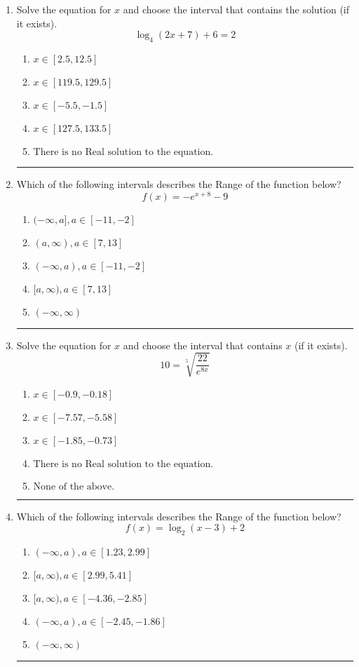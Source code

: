 \documentclass[14pt]{extbook}
\newcommand{\litem}[1]{\item#1\hspace*{-1cm}\rule{\textwidth}{0.4pt}}
\begin{document}
\begin{enumerate}
{\begin{enumerate}[label=\Alph*.]
\end{enumerate} }
\litem{
Solve the equation for $x$ and choose the interval that contains the solution (if it exists).\[ \log_{4}{(2x+7)}+6 = 2 \]\begin{enumerate}[label=\Alph*.]
\item \( x \in [2.5, 12.5] \)
\item \( x \in [119.5, 129.5] \)
\item \( x \in [-5.5, -1.5] \)
\item \( x \in [127.5, 133.5] \)
\item \( \text{There is no Real solution to the equation.} \)

\end{enumerate} }
\litem{
Which of the following intervals describes the Range of the function below?\[ f(x) = -e^{x+8}-9 \]\begin{enumerate}[label=\Alph*.]
\item \( (-\infty, a], a \in [-11, -2] \)
\item \( (a, \infty), a \in [7, 13] \)
\item \( (-\infty, a), a \in [-11, -2] \)
\item \( [a, \infty), a \in [7, 13] \)
\item \( (-\infty, \infty) \)

\end{enumerate} }
\litem{
 Solve the equation for $x$ and choose the interval that contains $x$ (if it exists).\[  10 = \sqrt[5]{\frac{22}{e^{8x}}} \]\begin{enumerate}[label=\Alph*.]
\item \( x \in [-0.9, -0.18] \)
\item \( x \in [-7.57, -5.58] \)
\item \( x \in [-1.85, -0.73] \)
\item \( \text{There is no Real solution to the equation.} \)
\item \( \text{None of the above.} \)

\end{enumerate} }
\litem{
Which of the following intervals describes the Range of the function below?\[ f(x) = \log_2{(x-3)}+2 \]\begin{enumerate}[label=\Alph*.]
\item \( (-\infty, a), a \in [1.23, 2.99] \)
\item \( [a, \infty), a \in [2.99, 5.41] \)
\item \( [a, \infty), a \in [-4.36, -2.85] \)
\item \( (-\infty, a), a \in [-2.45, -1.86] \)
\item \( (-\infty, \infty) \)


\end{enumerate}}
\end{enumerate}
\end{document}
